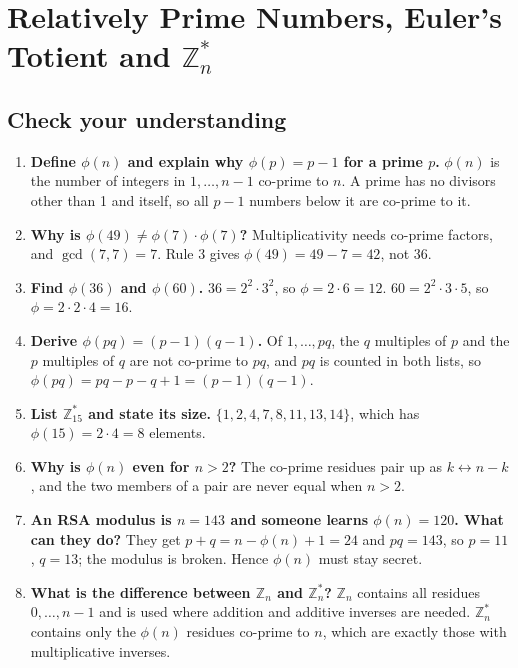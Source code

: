 \section{Relatively Prime Numbers, Euler's Totient and $\mathbb{Z}_n^*$}\label{q:10_totient}

\subsection*{Check your understanding}
\begin{enumerate}[leftmargin=1.5em]
  \item \textbf{Define $\phi(n)$ and explain why $\phi(p) = p - 1$ for a prime $p$.} $\phi(n)$ is the number of integers in $1, \dots, n-1$ co-prime to $n$. A prime has no divisors other than 1 and itself, so all $p - 1$ numbers below it are co-prime to it.
  \item \textbf{Why is $\phi(49) \ne \phi(7) \cdot \phi(7)$?} Multiplicativity needs co-prime factors, and $\gcd(7, 7) = 7$. Rule 3 gives $\phi(49) = 49 - 7 = 42$, not 36.
  \item \textbf{Find $\phi(36)$ and $\phi(60)$.} $36 = 2^2 \cdot 3^2$, so $\phi = 2 \cdot 6 = 12$. $60 = 2^2 \cdot 3 \cdot 5$, so $\phi = 2 \cdot 2 \cdot 4 = 16$.
  \item \textbf{Derive $\phi(pq) = (p-1)(q-1)$.} Of $1, \dots, pq$, the $q$ multiples of $p$ and the $p$ multiples of $q$ are not co-prime to $pq$, and $pq$ is counted in both lists, so $\phi(pq) = pq - p - q + 1 = (p-1)(q-1)$.
  \item \textbf{List $\mathbb{Z}_{15}^*$ and state its size.} $\{1, 2, 4, 7, 8, 11, 13, 14\}$, which has $\phi(15) = 2 \cdot 4 = 8$ elements.
  \item \textbf{Why is $\phi(n)$ even for $n > 2$?} The co-prime residues pair up as $k \leftrightarrow n - k$, and the two members of a pair are never equal when $n > 2$.
  \item \textbf{An RSA modulus is $n = 143$ and someone learns $\phi(n) = 120$. What can they do?} They get $p + q = n - \phi(n) + 1 = 24$ and $pq = 143$, so $p = 11$, $q = 13$; the modulus is broken. Hence $\phi(n)$ must stay secret.
  \item \textbf{What is the difference between $\mathbb{Z}_n$ and $\mathbb{Z}_n^*$?} $\mathbb{Z}_n$ contains all residues $0, \dots, n-1$ and is used where addition and additive inverses are needed. $\mathbb{Z}_n^*$ contains only the $\phi(n)$ residues co-prime to $n$, which are exactly those with multiplicative inverses.
\end{enumerate}
